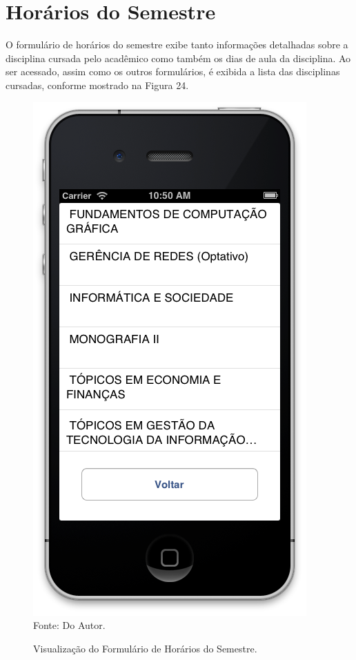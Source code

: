 \section{Horários do Semestre}
O formulário de horários do semestre exibe tanto informações detalhadas sobre a disciplina cursada pelo acadêmico como também os dias de aula da disciplina. Ao ser acessado, assim como os outros formulários, é exibida a lista das disciplinas cursadas, conforme mostrado na Figura 24.
\begin{figure}[!htb]
     \centering
     \caption[Formulário Horários do Semestre - Lista das Disciplinas]{Visualização do Formulário de Horários do Semestre.}
     \includegraphics[scale=0.34]{imagens/formhorariosemestre.png}
     \\  Fonte: Do Autor.
\end{figure}

